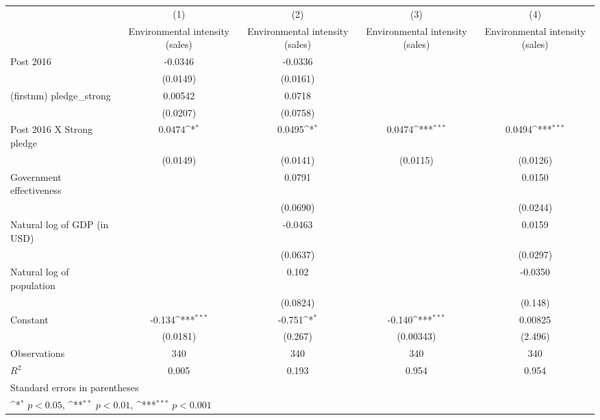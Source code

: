 {
\def\sym#1{\ifmmode^{#1}\else\(^{#1}\)\fi}
\begin{tabular}{l*{4}{c}}
\hline\hline
                    &\multicolumn{1}{c}{(1)}&\multicolumn{1}{c}{(2)}&\multicolumn{1}{c}{(3)}&\multicolumn{1}{c}{(4)}\\
                    &\multicolumn{1}{c}{Environmental intensity (sales)}&\multicolumn{1}{c}{Environmental intensity (sales)}&\multicolumn{1}{c}{Environmental intensity (sales)}&\multicolumn{1}{c}{Environmental intensity (sales)}\\
\hline
Post 2016           &     -0.0346         &     -0.0336         &                     &                     \\
                    &    (0.0149)         &    (0.0161)         &                     &                     \\
[1em]
(firstnm) pledge\_strong&     0.00542         &      0.0718         &                     &                     \\
                    &    (0.0207)         &    (0.0758)         &                     &                     \\
[1em]
Post 2016 X Strong pledge&      0.0474\sym{*}  &      0.0495\sym{*}  &      0.0474\sym{***}&      0.0494\sym{***}\\
                    &    (0.0149)         &    (0.0141)         &    (0.0115)         &    (0.0126)         \\
[1em]
Government effectiveness&                     &      0.0791         &                     &      0.0150         \\
                    &                     &    (0.0690)         &                     &    (0.0244)         \\
[1em]
Natural log of GDP (in USD)&                     &     -0.0463         &                     &      0.0159         \\
                    &                     &    (0.0637)         &                     &    (0.0297)         \\
[1em]
Natural log of population&                     &       0.102         &                     &     -0.0350         \\
                    &                     &    (0.0824)         &                     &     (0.148)         \\
[1em]
Constant            &      -0.134\sym{***}&      -0.751\sym{*}  &      -0.140\sym{***}&     0.00825         \\
                    &    (0.0181)         &     (0.267)         &   (0.00343)         &     (2.496)         \\
\hline
Observations        &         340         &         340         &         340         &         340         \\
\(R^{2}\)           &       0.005         &       0.193         &       0.954         &       0.954         \\
\hline\hline
\multicolumn{5}{l}{\footnotesize Standard errors in parentheses}\\
\multicolumn{5}{l}{\footnotesize \sym{*} \(p<0.05\), \sym{**} \(p<0.01\), \sym{***} \(p<0.001\)}\\
\end{tabular}
}
